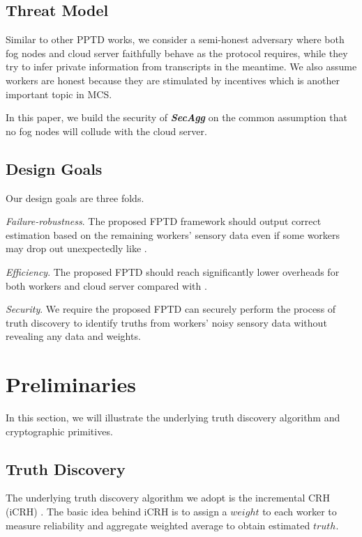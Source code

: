 \documentclass[conference,a4paper]{IEEEtran}
\def\textbi#1{\textbf{\em #1}}
\begin{document}
    \subsection{Threat Model}
     Similar to other PPTD works, we consider a semi-honest adversary where both fog nodes and cloud server faithfully behave as the protocol requires, while they try to infer private information from transcripts in the meantime. We also assume workers are honest because they are stimulated by incentives \cite{theseus} which is another important topic in MCS.

     In this paper, we build the security of \textbi{SecAgg} on the common assumption that no fog nodes will collude with the cloud server.


    \subsection{Design Goals}
    Our design goals are three folds.

    {\em Failure-robustness}. The proposed FPTD framework should output correct estimation based on the remaining workers' sensory data even if some workers may drop out unexpectedly like \cite{rtpt}.

    {\em Efficiency}. The proposed FPTD should reach significantly lower overheads for both workers and cloud server compared with \cite{rtpt}.

    {\em Security}. We require the proposed FPTD can securely perform the process of truth discovery to identify truths from workers' noisy sensory data without revealing any data and weights.


\section{Preliminaries}\label{prel}
    In this section, we will illustrate the underlying truth discovery algorithm and cryptographic primitives.
    \subsection{Truth Discovery}
    The underlying truth discovery algorithm we adopt is the incremental CRH (iCRH) \cite{CRH}. The basic idea behind iCRH is to assign a $weight$ to each worker to measure reliability and aggregate weighted average to obtain estimated $truth$.
\end{document}
